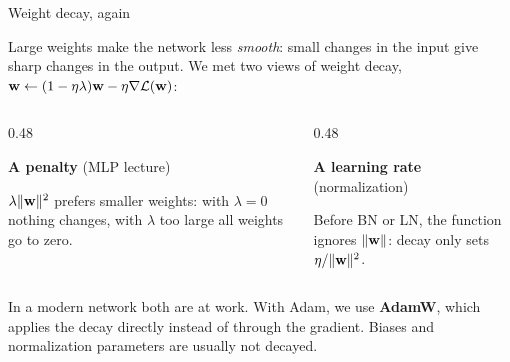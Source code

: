 \documentclass[11pt,aspectratio=169]{beamer}
\begin{document}
\begin{frame}{Weight decay, again}
    \setlength{\parskip}{5pt}

    Large weights make the network less \textit{smooth}: small changes in the
    input give sharp changes in the output. We met two views of weight decay,
    $\boldsymbol{\mathbf{w}} \leftarrow (1-\eta\lambda)\boldsymbol{\mathbf{w}} - \eta\nabla\mathcal{L}(\boldsymbol{\mathbf{w}})$:

    \begin{columns}[T,onlytextwidth]
        \begin{column}{0.48\textwidth}
            \begin{tcolorbox}[nndsblue,courseheight={wd}{}]
                \textbf{A penalty} (MLP lecture)

                $\lambda\lVert\boldsymbol{\mathbf{w}}\rVert^2$ prefers smaller weights: with
                $\lambda=0$ nothing changes, with $\lambda$ too large all
                weights go to zero.
            \end{tcolorbox}
        \end{column}
        \begin{column}{0.48\textwidth}
            \begin{tcolorbox}[nndsorange,courseheight={wd}{}]
                \textbf{A learning rate} (normalization)

                Before BN or LN, the function ignores $\lVert\boldsymbol{\mathbf{w}}\rVert$:
                decay only sets $\eta/\lVert\boldsymbol{\mathbf{w}}\rVert^2$.
            \end{tcolorbox}
        \end{column}
    \end{columns}

    In a modern network both are at work. With Adam, we use \textbf{AdamW},
    which applies the decay directly instead of through the gradient. Biases
    and normalization parameters are usually not decayed.


\end{frame}
\end{document}
